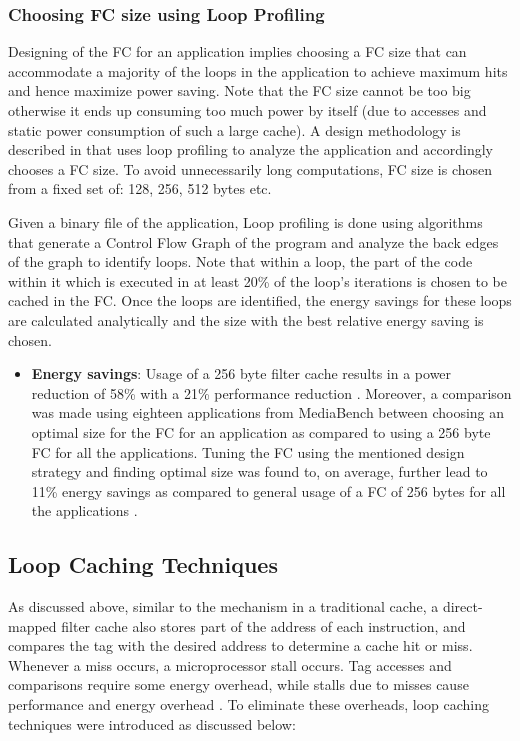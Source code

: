 \documentclass[conference]{IEEEtran}
\begin{document}
	\subsubsection{Choosing FC size using Loop Profiling}
	Designing of the FC for an application implies choosing a FC size that can accommodate a majority of the loops in the application to achieve maximum hits and hence maximize power saving. Note that the FC size cannot be too big otherwise it ends up consuming too much power by itself (due to accesses and static power consumption of such a large cache). A design methodology is described in \cite{fc1} that uses loop profiling to analyze the application and accordingly chooses a FC size. To avoid unnecessarily long computations, FC size is chosen from a fixed set of: 128, 256, 512 bytes etc.
	
	Given a binary file of the application, Loop profiling is done using algorithms that generate a Control Flow Graph of the program and analyze the back edges of the graph to identify loops. Note that within a loop, the part of the code within it which is executed in at least 20\% of the loop's iterations is chosen to be cached in the FC. Once the loops are identified, the energy savings for these loops are calculated analytically and the size with the best relative energy saving is chosen.
	\begin{itemize}
    \item\textbf{Energy savings}: Usage of a 256 byte filter cache results in a power reduction of 58\% with a 21\% performance reduction \cite{fc2}. Moreover, a comparison was made using eighteen applications from MediaBench between choosing an optimal size for the FC for an application as compared to using a 256 byte FC for all the applications. Tuning the FC using the mentioned design strategy and finding optimal size was found to, on average, further lead to 11\% energy savings as compared to general usage of a FC of 256 bytes for all the applications \cite{fc1}.

\end{itemize}
	
\subsection{Loop Caching Techniques}

As discussed above, similar to the mechanism in a traditional cache, a direct-mapped filter cache also stores part of the address of each instruction, and compares the tag with the desired address to determine a cache hit or miss. Whenever a miss occurs, a microprocessor stall occurs. Tag accesses and comparisons require some energy overhead, while stalls due to misses cause performance and energy overhead \cite{1}. To eliminate these overheads, loop caching techniques were introduced as discussed below:\\
\end{document}
